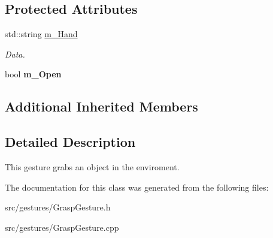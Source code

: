 \subsection*{Protected Attributes}
\begin{DoxyCompactItemize}
\item 
\mbox{\label{class_grasp_gesture_a44f8f1a3a011a52ccf55809a028f787c}} 
std\+::string \hyperlink{class_grasp_gesture_a44f8f1a3a011a52ccf55809a028f787c}{m\+\_\+\+Hand}
\begin{DoxyCompactList}\small\item\em Data. \end{DoxyCompactList}\item 
\mbox{\label{class_grasp_gesture_a5a3722d452f6b3ece2956802db2353f3}} 
bool {\bfseries m\+\_\+\+Open}
\end{DoxyCompactItemize}
\subsection*{Additional Inherited Members}


\subsection{Detailed Description}
This gesture grabs an object in the enviroment. 

The documentation for this class was generated from the following files\+:\begin{DoxyCompactItemize}
\item 
src/gestures/Grasp\+Gesture.\+h\item 
src/gestures/Grasp\+Gesture.\+cpp\end{DoxyCompactItemize}
